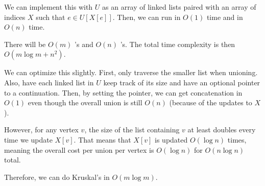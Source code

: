 We can implement this with $U$ as an array of linked lists
paired with an array of indices $X$ such that $e \in U[X[e]]$.
Then, we can run  in $O(1)$ time and  in $O(n)$ time.

There will be $O(m)$ 's and $O(n)$ 's.
The total time complexity is then $O(m \log m + n^2)$.

We can optimize this slightly.
First, only traverse the smaller list when unioning.
Also, have each linked list in $U$ keep track of its size
and have an optional pointer to a continuation.
Then, by setting the pointer, we can get concatenation in $O(1)$
even though the overall union is still $O(n)$ (because of the updates to $X$).

However, for any vertex $v$, the size of the list containing $v$
at least doubles every time we update $X[v]$.
That means that $X[v]$ is updated $O(\log n)$ times,
meaning the overall cost per union per vertex is $O(\log n)$ for $O(n \log n)$ total.

Therefore, we can do Kruskal's in $O(m\log m)$.
